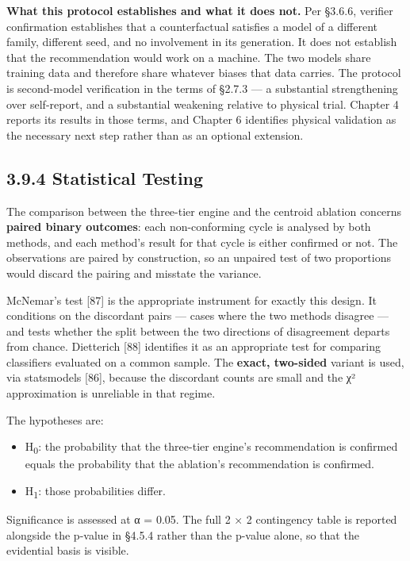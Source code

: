 \textbf{What this protocol establishes and what it does not.} Per §3.6.6, verifier confirmation establishes that a counterfactual satisfies a model of a different family, different seed, and no involvement in its generation. It does not establish that the recommendation would work on a machine. The two models share training data and therefore share whatever biases that data carries. The protocol is second-model verification in the terms of §2.7.3 --- a substantial strengthening over self-report, and a substantial weakening relative to physical trial. Chapter 4 reports its results in those terms, and Chapter 6 identifies physical validation as the necessary next step rather than as an optional extension.

\hypertarget{statistical-testing}{%
\subsection{3.9.4 Statistical Testing}\label{statistical-testing}}

The comparison between the three-tier engine and the centroid ablation concerns \textbf{paired binary outcomes}: each non-conforming cycle is analysed by both methods, and each method's result for that cycle is either confirmed or not. The observations are paired by construction, so an unpaired test of two proportions would discard the pairing and misstate the variance.

McNemar's test {[}87{]} is the appropriate instrument for exactly this design. It conditions on the discordant pairs --- cases where the two methods disagree --- and tests whether the split between the two directions of disagreement departs from chance. Dietterich {[}88{]} identifies it as an appropriate test for comparing classifiers evaluated on a common sample. The \textbf{exact, two-sided} variant is used, via statsmodels {[}86{]}, because the discordant counts are small and the χ² approximation is unreliable in that regime.

The hypotheses are:

\begin{itemize}
\tightlist
\item
  H\textsubscript{0}: the probability that the three-tier engine's recommendation is confirmed equals the probability that the ablation's recommendation is confirmed.
\item
  H\textsubscript{1}: those probabilities differ.
\end{itemize}

Significance is assessed at α = 0.05. The full 2 × 2 contingency table is reported alongside the p-value in §4.5.4 rather than the p-value alone, so that the evidential basis is visible.

